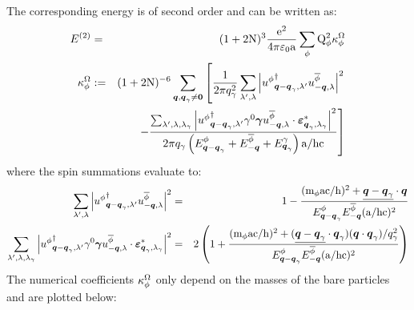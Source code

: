 \documentclass[10pt,a4paper,twoside,openany]{book}
\begin{document}
The corresponding energy is of second order and can be written as:
\begin{eqnarray*}
E^{(2)} & = & ( 1 + 2 \mathrm N )^3 \frac{\mathrm e^2}{4 \pi \mathrm \varepsilon_0 \mathrm a} \sum_{\phi} \mathrm Q_{\phi}^2 \kappa^\Omega_\phi \\
\kappa^\Omega_\phi & := & ( 1 + 2 \mathrm N )^{-6} \sum_{\boldsymbol{q},\boldsymbol{q}_\gamma \neq \boldsymbol{0}} \left[ \frac 1 {2 \pi q_\gamma^2} \sum_{\lambda',\lambda} \left| {u^{\phi}}^{\dagger}_{{\boldsymbol{q} - \boldsymbol{q}_\gamma}, {\lambda'}} u^{\overline{\phi}}_{{-\boldsymbol{q}}, {\lambda}} \right|^2 \right. \\
&& \left. - \frac {\sum_{\lambda',\lambda,\lambda_\gamma} \left| {u^{\phi}}^{\dagger}_{{\boldsymbol{q} - \boldsymbol{q}_\gamma}, {\lambda'}} \gamma^{0} \boldsymbol{\gamma} u^{\overline{\phi}}_{{-\boldsymbol{q}}, {\lambda}} \cdot \boldsymbol{\varepsilon}_{{\boldsymbol{q}_\gamma},{\lambda_\gamma}}^* \right|^2} {2 \pi q_\gamma \left( E^{\phi}_{\boldsymbol{q} - \boldsymbol{q}_\gamma} + E^{\overline{\phi}}_{-\boldsymbol{q}} + E^{\gamma}_{\boldsymbol{q}_\gamma} \right) \mathrm a / \mathrm h \mathrm c} \right]
\end{eqnarray*}
where the spin summations evaluate to:
\begin{eqnarray*}
\sum_{\lambda',\lambda} \left| {u^{\phi}}^{\dagger}_{{\boldsymbol{q} - \boldsymbol{q}_\gamma}, {\lambda'}} u^{\overline{\phi}}_{{-\boldsymbol{q}}, {\lambda}} \right|^2 & = & 1 - \frac{( \mathrm m_{\phi} \mathrm a \mathrm c / \mathrm h )^2 + \underline{\boldsymbol{q} - \boldsymbol{q}_\gamma} \cdot \boldsymbol{q}}{E^{\phi}_{\boldsymbol{q} - \boldsymbol{q}_\gamma} E^{\overline{\phi}}_{-\boldsymbol{q}} ( \mathrm a / \mathrm h \mathrm c )^2} \\
\sum_{\lambda',\lambda,\lambda_\gamma} \left| {u^{\phi}}^{\dagger}_{{\boldsymbol{q} - \boldsymbol{q}_\gamma}, {\lambda'}} \gamma^{0} \boldsymbol{\gamma} u^{\overline{\phi}}_{{-\boldsymbol{q}}, {\lambda}} \cdot \boldsymbol{\varepsilon}_{{\boldsymbol{q}_\gamma},{\lambda_\gamma}}^* \right|^2 & = & 2 \left( 1 + \frac{( \mathrm m_{\phi} \mathrm a \mathrm c / \mathrm h )^2 + ( \underline{\boldsymbol{q} - \boldsymbol{q}_\gamma} \cdot \boldsymbol{q}_\gamma ) ( \boldsymbol{q} \cdot \boldsymbol{q}_\gamma ) / q_\gamma^2}{E^{\phi}_{\boldsymbol{q} - \boldsymbol{q}_\gamma} E^{\overline{\phi}}_{-\boldsymbol{q}} ( \mathrm a / \mathrm h \mathrm c )^2} \right)
\end{eqnarray*}
The numerical coefficients $\kappa^\Omega_\phi$ only depend on the masses of the bare particles and are plotted below:
\end{document}
